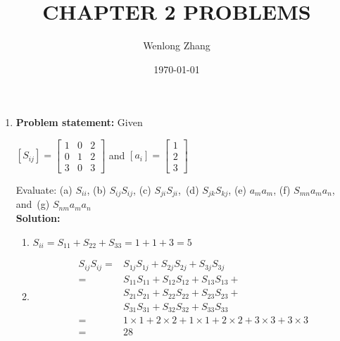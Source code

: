 \documentclass[a4paper, 12pt]{article}
\title{\textbf{CHAPTER 2 PROBLEMS}}
\author{Wenlong Zhang}
\date{\today}
\begin{document}
\maketitle

\begin{enumerate}
    \item \textbf{Problem statement:} Given \\
    \begin {center}
    \begin{math}
        \left[ S_{ij}\right] = \begin{bmatrix}
                1 & 0 & 2 \\
                0 & 1 & 2 \\
                3 & 0 & 3
            \end{bmatrix}
    \end{math} and
    \begin{math}
        \left[ a_{i}\right] = \begin{bmatrix}
                1 \\
                2 \\
                3
            \end{bmatrix}
    \end{math}
    \end {center}
    Evaluate: (a) \(S_{ii}\), (b) $S_{ij}S_{ij}$, (c) $S_{ji}S_{ji}$,\
    (d) $S_{jk}S_{kj}$, (e) $a_{m}a_{m}$, (f) $S_{mn}a_{m}a_{n}$, and\
    (g) $S_{nm}a_{m}a_{n}$ \\
    \textbf{Solution:}
    \begin{enumerate}
        \item \(S_{ii} = S_{11}+S_{22}+S_{33} = 1 + 1 + 3 = 5\)
        \item 
              \begin{align*}
              S_{ij}S_{ij} = & S_{1j}S_{1j} + S_{2j}S_{2j} + S_{3j}S_{3j}\\
                             = & S_{11}S_{11} + S_{12}S_{12} + S_{13}S_{13} + \\
                               & S_{21}S_{21} + S_{22}S_{22} + S_{23}S_{23} + \\
                               & S_{31}S_{31} + S_{32}S_{32} + S_{33}S_{33}\\
                             = & 1\times1 + 2\times2 + 1\times1 + 2\times2 + 3\times3 + 3\times3\\
                             = & 28
              \end{align*}
    \end{enumerate}
 \end{enumerate}
\end{document}
